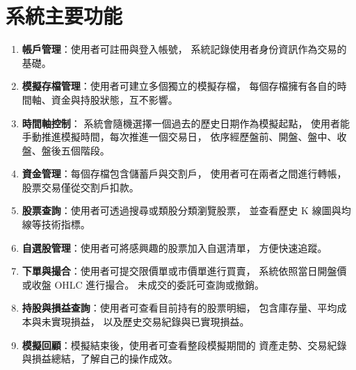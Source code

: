 \documentclass[UTF8, a4paper, 12pt, fontset=none]{ctexart}
\begin{document}
    \section{系統主要功能}
    \begin{enumerate}
        \item \textbf{帳戶管理}：使用者可註冊與登入帳號，
        系統記錄使用者身份資訊作為交易的基礎。

        \item \textbf{模擬存檔管理}：使用者可建立多個獨立的模擬存檔，
        每個存檔擁有各自的時間軸、資金與持股狀態，互不影響。

        \item \textbf{時間軸控制}：
        系統會隨機選擇一個過去的歷史日期作為模擬起點，
        使用者能手動推進模擬時間，每次推進一個交易日，
        依序經歷盤前、開盤、盤中、收盤、盤後五個階段。

        \item \textbf{資金管理}：每個存檔包含儲蓄戶與交割戶，
        使用者可在兩者之間進行轉帳，股票交易僅從交割戶扣款。

        \item \textbf{股票查詢}：使用者可透過搜尋或類股分類瀏覽股票，
        並查看歷史 K 線圖與均線等技術指標。

        \item \textbf{自選股管理}：使用者可將感興趣的股票加入自選清單，
        方便快速追蹤。

        \item \textbf{下單與撮合}：使用者可提交限價單或市價單進行買賣，
        系統依照當日開盤價或收盤 OHLC 進行撮合。
        未成交的委託可查詢或撤銷。

        \item \textbf{持股與損益查詢}：使用者可查看目前持有的股票明細，
        包含庫存量、平均成本與未實現損益，
        以及歷史交易紀錄與已實現損益。

        \item \textbf{模擬回顧}：模擬結束後，使用者可查看整段模擬期間的
        資產走勢、交易紀錄與損益總結，了解自己的操作成效。
    \end{enumerate}


\end{document}
